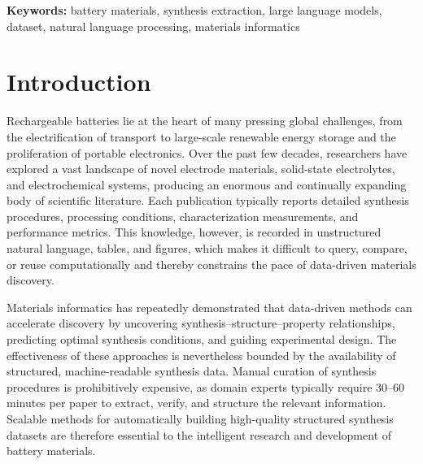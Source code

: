 \documentclass[12pt,a4paper]{article}
\begin{document}
\textbf{Keywords:} battery materials, synthesis extraction, large language models, dataset, natural language processing, materials informatics

\section{Introduction}
\label{sec:introduction}

Rechargeable batteries lie at the heart of many pressing global challenges, from the electrification of transport to large-scale renewable energy storage and the proliferation of portable electronics.\cite{janek2016solid,manthiram2017outlook} Over the past few decades, researchers have explored a vast landscape of novel electrode materials, solid-state electrolytes, and electrochemical systems, producing an enormous and continually expanding body of scientific literature. Each publication typically reports detailed synthesis procedures, processing conditions, characterization measurements, and performance metrics. This knowledge, however, is recorded in unstructured natural language, tables, and figures, which makes it difficult to query, compare, or reuse computationally and thereby constrains the pace of data-driven materials discovery.\cite{kononova2019text,olivetti2020data}

Materials informatics has repeatedly demonstrated that data-driven methods can accelerate discovery by uncovering synthesis--structure--property relationships,\cite{raccuglia2016machine,kim2017virtual} predicting optimal synthesis conditions,\cite{huo2019semi} and guiding experimental design.\cite{szymanski2023autonomous} The effectiveness of these approaches is nevertheless bounded by the availability of structured, machine-readable synthesis data. Manual curation of synthesis procedures is prohibitively expensive, as domain experts typically require 30--60 minutes per paper to extract, verify, and structure the relevant information.\cite{kononova2019text} Scalable methods for automatically building high-quality structured synthesis datasets are therefore essential to the intelligent research and development of battery materials.
\end{document}
